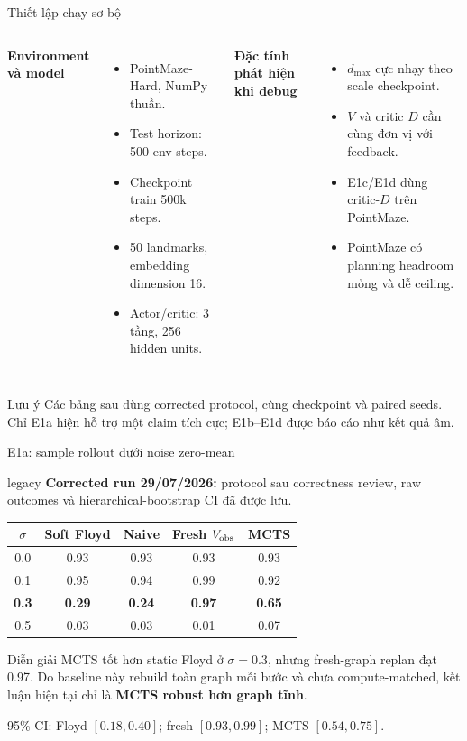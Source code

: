 \documentclass[aspectratio=169,10pt]{beamer}
\newcommand{\resultbanner}{%
  \begin{beamercolorbox}[rounded=true,sep=0.6ex,wd=\textwidth]{legacy}
    \color{LegacyFg}\scriptsize
    \textbf{Corrected run 29/07/2026:} protocol sau correctness review,
    raw outcomes và hierarchical-bootstrap CI đã được lưu.
  \end{beamercolorbox}\vspace{0.5em}
}
\begin{document}
\begin{frame}{Thiết lập chạy sơ bộ}
  \begin{columns}[T]
      \textbf{Environment và model}
      \begin{itemize}
        \item PointMaze-Hard, NumPy thuần.
        \item Test horizon: 500 env steps.
        \item Checkpoint train 500k steps.
        \item 50 landmarks, embedding dimension 16.
        \item Actor/critic: 3 tầng, 256 hidden units.
      \end{itemize}
      \textbf{Đặc tính phát hiện khi debug}
      \begin{itemize}
        \item $d_{\max}$ cực nhạy theo scale checkpoint.
        \item $V$ và critic $D$ cần cùng đơn vị với feedback.
        \item E1c/E1d dùng critic-$D$ trên PointMaze.
        \item PointMaze có planning headroom mỏng và dễ ceiling.
      \end{itemize}
  \end{columns}

  \begin{alertblock}{Lưu ý}
    Các bảng sau dùng corrected protocol, cùng checkpoint và paired seeds.
    Chỉ E1a hiện hỗ trợ một claim tích cực; E1b--E1d được báo cáo như kết quả âm.
  \end{alertblock}
\end{frame}

\begin{frame}{E1a: sample rollout dưới noise zero-mean}
  \resultbanner
  \small
  \begin{tabular}{@{}ccccc@{}}
    \toprule
    $\sigma$ & Soft Floyd & Naive & Fresh $V_{\rm obs}$ & MCTS \\
    \midrule
    0.0 & 0.93 & 0.93 & 0.93 & 0.93 \\
    0.1 & 0.95 & 0.94 & 0.99 & 0.92 \\
    \textbf{0.3} & \textbf{0.29} & \textbf{0.24} & \textbf{0.97} & \textbf{0.65} \\
    0.5 & 0.03 & 0.03 & 0.01 & 0.07 \\
    \bottomrule
  \end{tabular}

  \vspace{0.8em}
  \begin{block}{Diễn giải}
    MCTS tốt hơn static Floyd ở $\sigma=0.3$, nhưng fresh-graph replan đạt 0.97.
    Do baseline này rebuild toàn graph mỗi bước và chưa compute-matched, kết luận
    hiện tại chỉ là \textbf{MCTS robust hơn graph tĩnh}.
  \end{block}
  \scriptsize 95\% CI: Floyd $[0.18,0.40]$; fresh $[0.93,0.99]$;
  MCTS $[0.54,0.75]$.
\end{frame}
\end{document}
